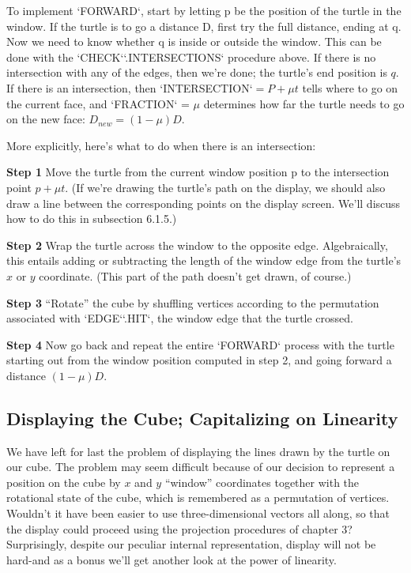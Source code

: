 \documentclass{book}
\begin{document}
To implement \textsc{`FORWARD`}, start by letting p be the position of the turtle
in the window. If the turtle is to go a distance D, first try the full
distance, ending at q. Now we need to know whether q is inside or
outside the window. This can be done with the \textsc{`CHECK`}\textsc{`.INTERSECTIONS`}
procedure above. If there is no intersection with any of the edges, then
we're done; the turtle's end position is $q$. If there is an intersection,
then \textsc{`INTERSECTION`}$ = P + \mu t$ tells where to go on the current face, and
\textsc{`FRACTION`} = $\mu$ determines how far the turtle needs to go on the new
face: $D_{new} = (1 - \mu)D$.

More explicitly, here's what to do when there is an intersection:

\textbf{Step 1} Move the turtle from the current window position p to the
intersection point $p + \mu t$. (If we're drawing the turtle's path on the
display, we should also draw a line between the corresponding points on
the display screen. We'll discuss how to do this in subsection 6.1.5.)

\textbf{Step 2} Wrap the turtle across the window to the opposite edge. Algebraically, this entails adding or subtracting the length of the window
edge from the turtle's $x$ or $y$ coordinate. (This part of the path doesn't
get drawn, of course.)

\textbf{Step 3} ``Rotate'' the cube by shuffling vertices according to the permutation associated with \textsc{`EDGE`}\textsc{`.HIT`}, the window edge that the turtle crossed.

\textbf{Step 4} Now go back and repeat the entire \textsc{`FORWARD`} process with the
turtle starting out from the window position computed in step 2, and
going forward a distance $(1 - \mu)D$.

\subsection{Displaying the Cube; Capitalizing on Linearity}

We have left for last the problem of displaying the lines drawn by
the turtle on our cube. The problem may seem difficult because of
our decision to represent a position on the cube by $x$ and $y$ ``window''
coordinates together with the rotational state of the cube, which is
remembered as a permutation of vertices. Wouldn't it have been easier to
use three-dimensional vectors all along, so that the display could proceed
using the projection procedures of chapter 3? Surprisingly, despite our
peculiar internal representation, display will not be hard-and as a bonus
we'll get another look at the power of linearity.
\end{document}
